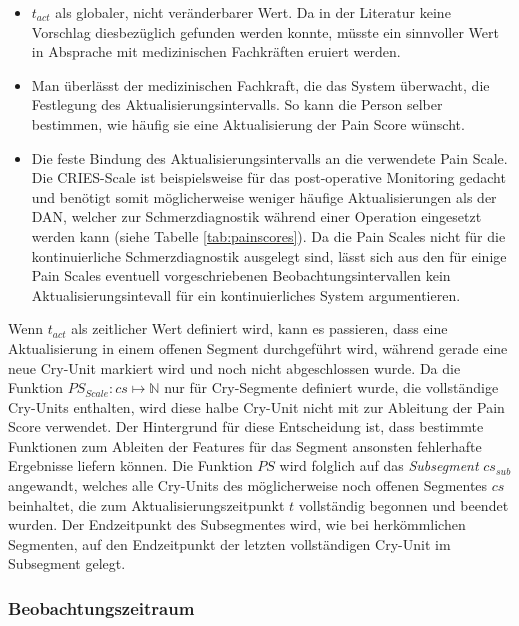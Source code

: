  \begin{itemize}
 \item $t_{act}$ als globaler, nicht veränderbarer Wert. Da in der Literatur keine Vorschlag diesbezüglich gefunden werden konnte, müsste ein sinnvoller Wert in Absprache mit medizinischen Fachkräften eruiert werden. 
 \item Man überlässt der medizinischen Fachkraft, die das System überwacht, die Festlegung des Aktualisierungsintervalls. So kann die Person selber bestimmen, wie häufig sie eine Aktualisierung der Pain Score wünscht.
 \item Die feste Bindung des Aktualisierungsintervalls an die verwendete Pain Scale. Die CRIES-Scale ist beispielsweise für das post-operative Monitoring gedacht und benötigt somit möglicherweise weniger häufige Aktualisierungen als der DAN, welcher zur Schmerzdiagnostik während einer Operation eingesetzt werden kann (siehe Tabelle \ref{tab:painscores}). Da die Pain Scales nicht für die kontinuierliche Schmerzdiagnostik ausgelegt sind, lässt sich aus den für einige Pain Scales eventuell vorgeschriebenen Beobachtungsintervallen kein Aktualisierungsintevall für ein kontinuierliches System argumentieren.
 \end{itemize}
 
 Wenn $t_{act}$ als zeitlicher Wert definiert wird, kann es passieren, dass eine Aktualisierung in einem offenen Segment durchgeführt wird, während gerade eine neue Cry-Unit markiert wird und noch nicht abgeschlossen wurde. Da die Funktion $PS_{Scale}: cs \mapsto \mathbb{N}$ nur für Cry-Segmente definiert wurde, die vollständige Cry-Units enthalten, wird diese \glqq halbe Cry-Unit\grqq{} nicht mit zur Ableitung der Pain Score verwendet. Der Hintergrund für diese Entscheidung ist, dass bestimmte Funktionen zum Ableiten der Features für das Segment ansonsten fehlerhafte Ergebnisse liefern können. Die Funktion $PS$ wird folglich auf das \emph{Subsegment} $cs_{sub}$ angewandt, welches alle Cry-Units des möglicherweise noch offenen Segmentes $cs$ beinhaltet, die zum Aktualisierungszeitpunkt $t$ vollständig begonnen und beendet wurden. Der Endzeitpunkt des Subsegmentes wird, wie bei herkömmlichen Segmenten, auf den Endzeitpunkt der letzten vollständigen Cry-Unit im Subsegment gelegt.
  
 \subsubsection{Beobachtungszeitraum}

